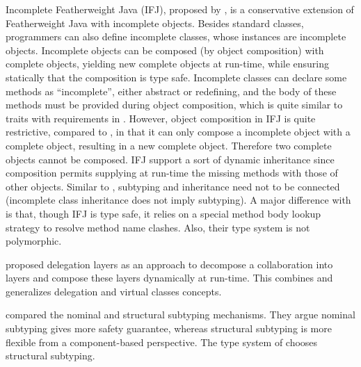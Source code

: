 Incomplete Featherweight Java (IFJ), proposed by \citet{bettini2008type}, is a
conservative extension of Featherweight Java with incomplete objects. Besides
standard classes, programmers can also define incomplete classes, whose
instances are incomplete objects. Incomplete objects can be composed (by object
composition) with complete objects, yielding new complete objects at run-time,
while ensuring statically that the composition is type safe. Incomplete classes
can declare some methods as ``incomplete'', either abstract or redefining, and
the body of these methods must be provided during object composition, which is
quite similar to traits with requirements in \name. However, object composition
in IFJ is quite restrictive, compared to \name, in that it can only compose a
incomplete object with a complete object, resulting in a new complete object.
Therefore two complete objects cannot be composed. IFJ support a sort of dynamic
inheritance since composition permits supplying at run-time the missing methods
with those of other objects. Similar to \name, subtyping and inheritance need
not to be connected (incomplete class inheritance does not imply subtyping). A
major difference with \name is that, though IFJ is type safe, it relies on a
special method body lookup strategy to resolve method name clashes. Also, their
type system is not polymorphic.

\citet{ostermann2002dynamically} proposed delegation layers as an approach to
decompose a collaboration into layers and compose these layers dynamically at
run-time. This combines and generalizes delegation and virtual classes concepts.

\citet{ostermann2008nominal} compared the nominal and structural subtyping
mechanisms. They argue nominal subtyping gives more safety guarantee, whereas
structural subtyping is more flexible from a component-based perspective. The
type system of \name chooses structural subtyping.




